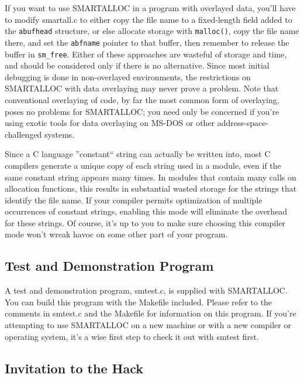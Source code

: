 If you want to use SMARTALLOC in a program with overlayed data, you'll have to
modify smartall.c to either copy the file name to a fixed-length field added
to the {\tt abufhead} structure, or else allocate storage with {\tt malloc()},
copy the file name there, and set the {\tt abfname} pointer to that buffer,
then remember to release the buffer in {\tt sm\_free}. Either of these
approaches are wasteful of storage and time, and should be considered only if
there is no alternative. Since most initial debugging is done in non-overlayed
environments, the restrictions on SMARTALLOC with data overlaying may never
prove a problem. Note that conventional overlaying of code, by far the most
common form of overlaying, poses no problems for SMARTALLOC; you need only be
concerned if you're using exotic tools for data overlaying on MS-DOS or other
address-space-challenged systems. 

Since a C language ''constant`` string can actually be written into, most C
compilers generate a unique copy of each string used in a module, even if the
same constant string appears many times. In modules that contain many calls on
allocation functions, this results in substantial wasted storage for the
strings that identify the file name. If your compiler permits optimization of
multiple occurrences of constant strings, enabling this mode will eliminate
the overhead for these strings. Of course, it's up to you to make sure
choosing this compiler mode won't wreak havoc on some other part of your
program. 

\subsection{ Test and Demonstration Program}

A test and demonstration program, smtest.c, is supplied with SMARTALLOC. You
can build this program with the Makefile included. Please refer to the
comments in smtest.c and the Makefile for information on this program. If
you're attempting to use SMARTALLOC on a new machine or with a new compiler or
operating system, it's a wise first step to check it out with smtest first. 

\subsection{ Invitation to the Hack}


